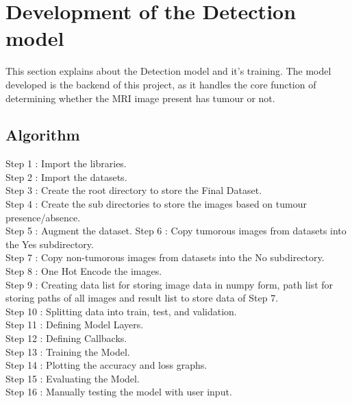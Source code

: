 \section{Development of the Detection model}
This section explains about the Detection model and it's training. The model developed is the backend of this project, as it handles the core function of determining whether the MRI image present has tumour or not.
\subsection{Algorithm}
Step 1 : Import the libraries.\\ 
Step 2 : Import the datasets.\\ 
Step 3 : Create the root directory to store the Final Dataset.\\ 
Step 4 : Create the sub directories to store the images based on tumour presence/absence.\\ 
Step 5 : Augment the dataset.
Step 6 : Copy tumorous images from datasets into the Yes subdirectory.\\ 
Step 7 : Copy non-tumorous images from datasets into the No subdirectory.\\
Step 8 : One Hot Encode the images.\\ 
Step 9 : Creating data list for storing image data in numpy form, path list for storing paths of all images and result list to store data of Step 7.\\ 
Step 10 : Splitting data into train, test, and validation.\\ 
Step 11 : Defining Model Layers.\\ 
Step 12 : Defining Callbacks.\\ 
Step 13 : Training the Model.\\ 
Step 14 : Plotting the accuracy and loss graphs.\\ 
Step 15 : Evaluating the Model.\\ 
Step 16 : Manually testing the model with user input.\\ 
